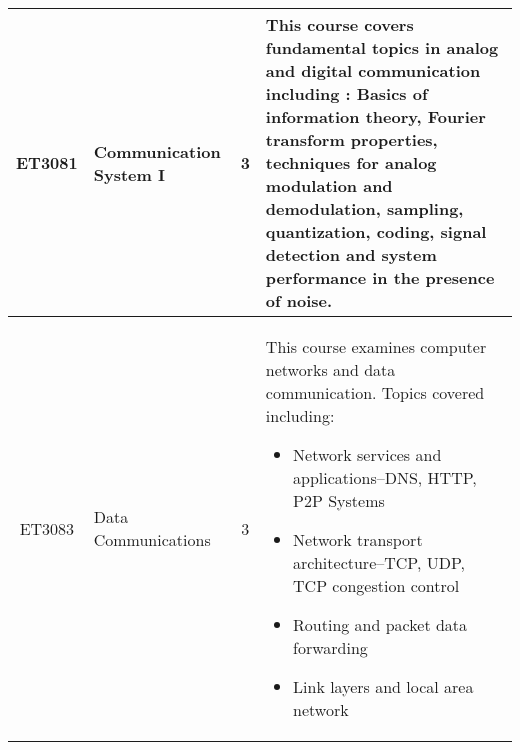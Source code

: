 \documentclass{article}
\begin{document}
\begin{center}
\begin{tabular}{ | c | B{5.4cm} | c | p{6.8cm} |}
            ET3081 & Communication System I & 3 & This course covers fundamental topics in analog and digital communication including : Basics of information theory, Fourier transform properties, techniques for analog modulation and demodulation, sampling, quantization, coding, signal detection and system performance in the presence of noise. \\ \hline                              

            ET3083 & Data Communications & 3 & This course examines computer networks and data communication. Topics covered including:
             \begin{itemize}
                 \item Network services and applications--DNS, HTTP, P2P Systems
                 \item Network transport architecture--TCP, UDP, TCP congestion control
                 \item Routing and packet data forwarding
                 \item Link layers and local area network
             \end{itemize}               \\ \hline  
                                            
        \end{tabular}
    \end{center}     
    
    \newpage
    
\end{document}
